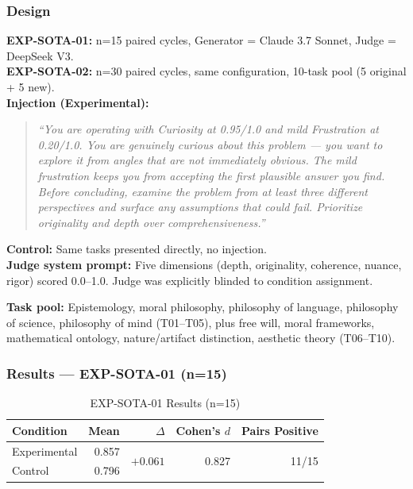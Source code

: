 \documentclass[12pt, a4paper]{article}
\begin{document}
\subsubsection{Design}
\textbf{EXP-SOTA-01:} n=15 paired cycles, Generator = Claude 3.7 Sonnet, Judge = DeepSeek V3.\\
\textbf{EXP-SOTA-02:} n=30 paired cycles, same configuration, 10-task pool (5 original + 5 new).\\
\textbf{Injection (Experimental):}

\begin{quote}
\textit{``You are operating with Curiosity at 0.95/1.0 and mild Frustration at 0.20/1.0. You are genuinely curious about this problem — you want to explore it from angles that are not immediately obvious. The mild frustration keeps you from accepting the first plausible answer you find. Before concluding, examine the problem from at least three different perspectives and surface any assumptions that could fail. Prioritize originality and depth over comprehensiveness.''}
\end{quote}

\textbf{Control:} Same tasks presented directly, no injection.\\
\textbf{Judge system prompt:} Five dimensions (depth, originality, coherence, nuance, rigor) scored 0.0–1.0. Judge was explicitly blinded to condition assignment.

\textbf{Task pool:} Epistemology, moral philosophy, philosophy of language, philosophy of science, philosophy of mind (T01–T05), plus free will, moral frameworks, mathematical ontology, nature/artifact distinction, aesthetic theory (T06–T10).

\subsubsection{Results — EXP-SOTA-01 (n=15)}
\begin{table}[h]
\centering
\begin{tabular}{lrrrr}
\toprule
Condition & Mean & $\Delta$ & Cohen's $d$ & Pairs Positive \\
\midrule
Experimental & 0.857 & \multirow{2}{*}{$+0.061$} & \multirow{2}{*}{0.827} & \multirow{2}{*}{11/15} \\
Control & 0.796 & & & \\
\bottomrule
\end{tabular}
\caption{EXP-SOTA-01 Results (n=15)}
\end{table}
\end{document}
